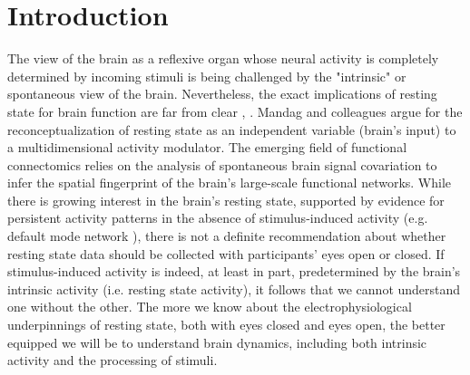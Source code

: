 \documentclass[11pt, onecolumn]{article}
\begin{document}

\section{Introduction}
The view of the brain as a reflexive organ whose neural activity is completely determined by incoming stimuli is being challenged by the "intrinsic" or spontaneous view of the brain. Nevertheless, the exact implications of resting state for brain function are far from clear \citep{schneider2008resting}, \citep{northoff2010brain}. Mandag and colleagues \citep{maandag2007energetics} argue for the reconceptualization of resting state as an independent variable (brain’s input) to a multidimensional activity modulator. The emerging field of functional connectomics relies on the analysis of spontaneous brain signal covariation to infer the spatial fingerprint of the brain's large-scale functional networks. While there is growing interest in the brain's  resting state, supported by evidence for persistent activity patterns in the absence of stimulus-induced activity (e.g. default mode network \citep{greicius2004default}), there is not a definite recommendation about whether resting state data should be collected with participants' eyes open or closed. If stimulus-induced activity is indeed, at least in part, predetermined by the brain’s intrinsic activity (i.e. resting state activity), it follows that we cannot understand one without the other. The more we know about the electrophysiological underpinnings of resting state, both with eyes closed and eyes open, the better equipped we will be to understand brain dynamics, including both intrinsic activity and the processing of stimuli. 
\end{document}
